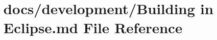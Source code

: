 \hypertarget{Building_01in_01Eclipse_8md}{\section{docs/development/\+Building in Eclipse.\+md File Reference}
\label{Building_01in_01Eclipse_8md}
}
